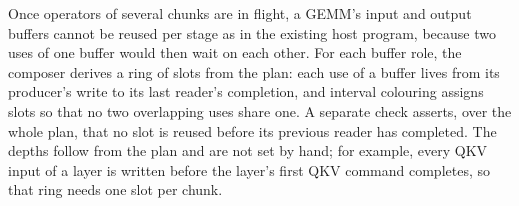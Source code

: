 Once operators of several chunks are in flight, a GEMM's input and output buffers cannot be reused per stage as in the existing host program, because two uses of one buffer would then wait on each other.
For each buffer role, the composer derives a ring of slots from the plan: each use of a buffer lives from its producer's write to its last reader's completion, and interval colouring assigns slots so that no two overlapping uses share one.
A separate check asserts, over the whole plan, that no slot is reused before its previous reader has completed.
The depths follow from the plan and are not set by hand; for example, every QKV input of a layer is written before the layer's first QKV command completes, so that ring needs one slot per chunk.

